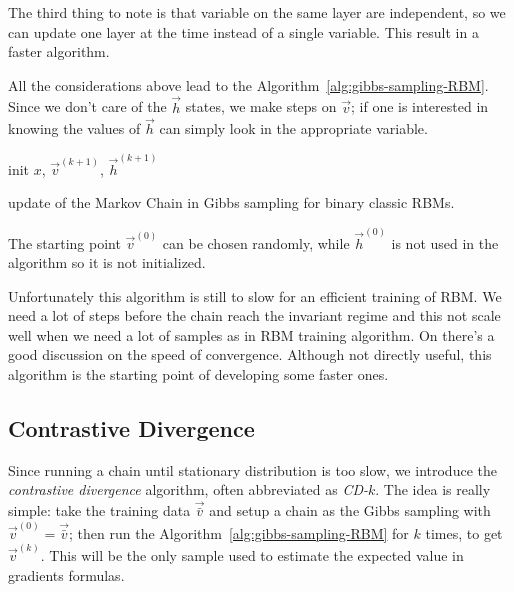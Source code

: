   The third thing to note is that variable on the same layer are independent, so we can update
  one layer at the time instead of a single variable. This result in a faster algorithm.
  
  All the considerations above lead to the Algorithm~\ref{alg:gibbs-sampling-RBM}. Since
  we don't care of the \(\vec{h}\) states, we make steps on \(\vec{v}\); if one is interested
  in knowing the values of \(\vec{h}\) can simply look in the appropriate variable.
  
  \begin{algorithm}[H]
    \DontPrintSemicolon
    
    
    init \(x\), \(\vec{v}^{(k+1)}\), \(\vec{h}^{(k+1)}\)\;
  
    \caption{update of the Markov Chain in Gibbs sampling for binary classic RBMs.}
    \label{alg:gibbs-sampling-RBM}
  \end{algorithm}

  The starting point \(\vec{v}^{(0)}\) can be chosen randomly, while \(\vec{h}^{(0)}\)
  is not used in the algorithm so it is not initialized.

  Unfortunately this algorithm is still to slow for an efficient training of RBM.
  We need a lot of steps before the chain reach the invariant regime and this not
  scale well when we need a lot of samples as in RBM training algorithm. On
  \cite{fischer2012introduction} there's a good discussion on the speed of convergence.
  Although not directly useful, this algorithm is the starting point of developing
  some faster ones. 
   
  \subsection{Contrastive Divergence}
  Since running a chain until stationary distribution is too slow, we introduce the
  \emph{contrastive divergence} algorithm, often  abbreviated as \emph{CD-\(k\)}.
  The idea is really simple:
  take the training data \(\vec{\bar{v}}\) and setup a chain as the Gibbs sampling with
  \(\vec{v}^{(0)} = \vec{\bar{v}}\); then run the Algorithm~\ref{alg:gibbs-sampling-RBM}
  for \(k\) times, to get \(\vec{v}^{(k)}\). This will be the only sample used to estimate
  the expected value in gradients formulas.
  
